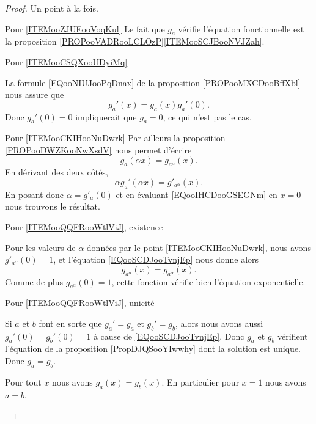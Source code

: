 \begin{proof}
    Un point à la fois.
    \begin{subproof}
        \item[Pour \ref{ITEMooZJUEooVoqKul}]
            Le fait que \( g_a\) vérifie l'équation fonctionnelle est la proposition \ref{PROPooVADRooLCLOzP}\ref{ITEMooSCJBooNVJZah}.

        \item[Pour \ref{ITEMooCSQXooUDyiMq}]

            La formule \eqref{EQooNIUJooPqDnax} de la proposition \ref{PROPooMXCDooBffXbl} nous assure que
            \begin{equation}        \label{EQooSCDJooTvnjEp}
                g_a'(x)=g_a(x)g_a'(0).
            \end{equation}
            Donc \( g_a'(0)=0\) impliquerait que \( g_a=0\), ce qui n'est pas le cas.

        \item[Pour \ref{ITEMooCKIHooNuDwrk}]
            Par ailleurs la proposition \ref{PROPooDWZKooNwXsdV} nous permet d'écrire
            \begin{equation}
                g_a(\alpha x)=g_{a^{\alpha}}(x).
            \end{equation}
            En dérivant des deux côtés,
            \begin{equation}        \label{EQooIHCDooGSEGNm}
                \alpha g_a'(\alpha x)=g'_{a^{\alpha}}(x).
            \end{equation}
            En posant donc \( \alpha=g'_a(0)\) et en évaluant \eqref{EQooIHCDooGSEGNm} en \( x=0\) nous trouvons le résultat.

        \item[Pour \ref{ITEMooQQFRooWtlViJ}, existence]

            Pour les valeurs de \( \alpha\) données par le point \ref{ITEMooCKIHooNuDwrk}, nous avons \( g'_{a^{\alpha}}(0)=1\), et l'équation \eqref{EQooSCDJooTvnjEp} nous donne alors
            \begin{equation}
                g_{a^{\alpha}}(x)=g_{a^{\alpha}}(x).
            \end{equation}
            Comme de plus \( g_{a^{\alpha}}(0)=1\), cette fonction vérifie bien l'équation exponentielle.
        \item[Pour \ref{ITEMooQQFRooWtlViJ}, unicité]

            Si \( a\) et \( b\) font en sorte que \( g_a'=g_a\) et \( g_b'=g_b\), alors nous avons aussi \( g_a'(0)=g_b'(0)=1\) à cause de \eqref{EQooSCDJooTvnjEp}. Donc \( g_a\) et \( g_b\) vérifient l'équation de la proposition \ref{PropDJQSooYIwwhy} dont la solution est unique. Donc \( g_a=g_b\).

            Pour tout \( x\) nous avons \( g_a(x)=g_b(x)\). En particulier pour \( x=1\) nous avons \( a=b\).
    \end{subproof}
\end{proof}

